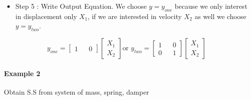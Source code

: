 \begin{itemize}
	\item Step 5 : Write Output Equation. We choose \(y=y_{one}\) because we only interest in displacement only \(X_1\), if we are interested in velocity \(X_2\) as well we choose \(y=y_{two}\).
\end{itemize}
\[
y_{one} =
\begin{bmatrix}
	1 &   & 0 
\end{bmatrix}
\begin{bmatrix}
	X_1 \\
	X_2 
\end{bmatrix} \text{or  }
y_{two} = 
\begin{bmatrix}
	1 &   & 0 \\
	0 &   & 1 
\end{bmatrix}
\begin{bmatrix}
	X_1 \\
	X_2 
\end{bmatrix}
\]



\paragraph{Example 2} Obtain S.S from system of mass, spring, damper

\begin{figure}[ht]
	\centering
	
\end{figure}

